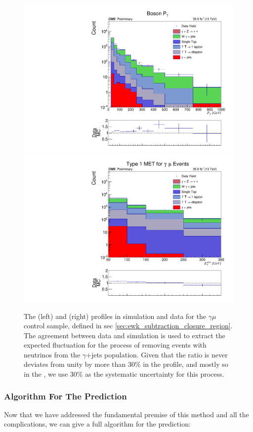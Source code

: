       \begin{figure}[h!]
        \centering
        \includegraphics[width=.46\textwidth]{figures/datavsmc/mugamma/BosonPT_widebin.pdf}
        \includegraphics[width=.46\textwidth]{figures/datavsmc/mugamma/Type1MET_SRBin.pdf}
        \caption[The \pt (left) and \MET (right) profiles in simulation and data for the $\gamma \mu$ control sample, defined in sec \ref{sec:ewk_subtraction_closure_region}.]{The \pt (left) and \MET (right) profiles in simulation and data for the $\gamma \mu$ control sample, defined in sec \ref{sec:ewk_subtraction_closure_region}. The agreement between data and simulation is used to extract the expected fluctuation for the process of removing events with neutrinos from the $\gamma$+jets population. Given that the ratio is never deviates from unity by more than 30\% in the \MET profile, and mostly so in the \pt, we use 30\% as the systematic uncertainty for this process.}
        \label{fig:gamma_mu_closure}
      \end{figure}



    \subsubsection{Algorithm For The Prediction}

      Now that we have addressed the fundamental premise of this method and all the complications, we can give a full algorithm for the prediction:

